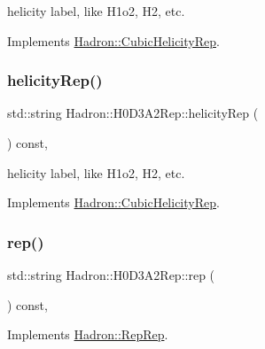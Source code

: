 helicity label, like H1o2, H2, etc. 

Implements \mbox{\hyperlink{structHadron_1_1CubicHelicityRep_af1096946b7470edf0a55451cc662f231}{Hadron\+::\+Cubic\+Helicity\+Rep}}.

\mbox{\label{structHadron_1_1H0D3A2Rep_aed7cbc2156d185f430ce0ce0a4c29f54}} 
\subsubsection{\texorpdfstring{helicityRep()}{helicityRep()}\hspace{0.1cm}{\footnotesize\ttfamily [3/3]}}
{\footnotesize\ttfamily std\+::string Hadron\+::\+H0\+D3\+A2\+Rep\+::helicity\+Rep (\begin{DoxyParamCaption}{ }\end{DoxyParamCaption}) const\hspace{0.3cm}{\ttfamily [inline]}, {\ttfamily [virtual]}}

helicity label, like H1o2, H2, etc. 

Implements \mbox{\hyperlink{structHadron_1_1CubicHelicityRep_af1096946b7470edf0a55451cc662f231}{Hadron\+::\+Cubic\+Helicity\+Rep}}.

\mbox{\label{structHadron_1_1H0D3A2Rep_a11e300b7b2215df67123d3d9e8747cb6}} 
\subsubsection{\texorpdfstring{rep()}{rep()}\hspace{0.1cm}{\footnotesize\ttfamily [1/5]}}
{\footnotesize\ttfamily std\+::string Hadron\+::\+H0\+D3\+A2\+Rep\+::rep (\begin{DoxyParamCaption}{ }\end{DoxyParamCaption}) const\hspace{0.3cm}{\ttfamily [inline]}, {\ttfamily [virtual]}}



Implements \mbox{\hyperlink{structHadron_1_1RepRep_ab3213025f6de249f7095892109575fde}{Hadron\+::\+Rep\+Rep}}.

\mbox{\label{structHadron_1_1H0D3A2Rep_a11e300b7b2215df67123d3d9e8747cb6}} 
